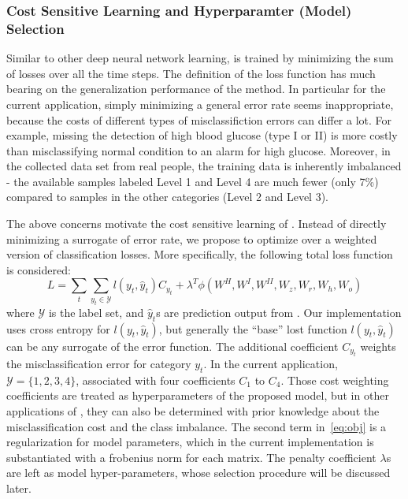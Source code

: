 \subsubsection{Cost Sensitive Learning and Hyperparamter (Model) Selection}
Similar to other deep neural network learning, \modelname is trained by minimizing the sum of losses over all the time steps.
The definition of the loss function has much bearing on the generalization performance of the method.
In particular for the current application, simply minimizing a general error rate seems inappropriate, because the costs of different types of misclassifiction errors can differ a lot.
For example, missing the detection of high blood glucose (type I or II) is more costly than misclassifying normal condition to an alarm for high glucose.
Moreover, in the collected data set from real people, the training data is inherently imbalanced - the available samples labeled Level 1 and Level 4 are much fewer (only 7\%) compared to samples in the other categories (Level 2 and Level 3).

The above concerns motivate the cost sensitive learning of \modelname.
Instead of directly minimizing a surrogate of error rate, we propose to optimize over a weighted version of classification losses.
More specifically, the following total loss function is considered:
\begin{equation}
\label{eq:obj}
L = \sum_{t} \sum_{y_t \in \mathcal{Y}} l(y_t,\hat{y}_t)C_{y_t} + \lambda^T\phi (W^H,W^I,W^{II},W_z,W_r,W_h,W_o)
\end{equation}
where $\mathcal{Y}$ is the label set, and $\hat{y}_t$s are prediction output from \modelname.
Our implementation uses cross entropy for $l(y_t,\hat{y}_t)$, but generally the ``base'' lost function $l(y_t,\hat{y}_t)$ can be any surrogate of the error function.
The additional coefficient $C_{y_t}$ weights the misclassification error for category $y_t$.
In the current application, $\mathcal{Y} = \{1,2,3,4\}$, associated with four coefficients $C_1$ to $C_4$.
Those cost weighting coefficients are treated as hyperparameters of the proposed model, but in other applications of \modelname, they can also be determined with prior knowledge about the misclassification cost and the class imbalance. The second term in~\ref{eq:obj} is a regularization for model parameters, which in the current implementation is substantiated with a frobenius norm for each matrix. The penalty coefficient $\lambda$s are left as model hyper-parameters, whose selection procedure will be discussed later.

